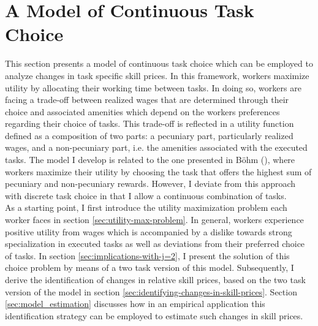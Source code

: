 \documentclass[../main.tex]{subfiles}
\begin{document}
\section{A Model of Continuous Task Choice} \label{sec:tractable-model-of-cont-task-choice}
This section presents a model of continuous task choice which can be employed to analyze changes in task specific skill prices. In this framework, workers maximize utility by allocating  their working time between tasks. In doing so, workers are facing a trade-off between realized wages that are determined through their choice and associated amenities which depend on the workers preferences regarding their choice of tasks. This trade-off is reflected in a utility function defined as a composition of two parts: a pecuniary part, particularly realized wages, and a non-pecuniary part, i.e. the amenities associated with the executed tasks. The model I develop is related to the one presented in Böhm (\citeyear{bohm2019price}), where workers maximize their utility by choosing the task that offers the highest sum of pecuniary and non-pecuniary rewards. However, I deviate from this approach with discrete task choice in that I allow a continuous combination of tasks.
\\
As a starting point, I first introduce the utility maximization problem each worker faces in section \ref{sec:utility-max-problem}. In general, workers experience positive utility from wages which is accompanied by a dislike towards strong specialization in executed tasks as well as deviations from their preferred choice of tasks. In section \ref{sec:implications-with-j=2}, I present the solution of this choice problem by means of a two task version of this model. Subsequently, I derive the identification of changes in relative skill prices, based on the two task version of the model in section \ref{sec:identifying-changes-in-skill-prices}. Section \ref{sec:model_estimation} discusses how in an empirical application this identification strategy can be employed to estimate such changes in skill prices.
\end{document}
